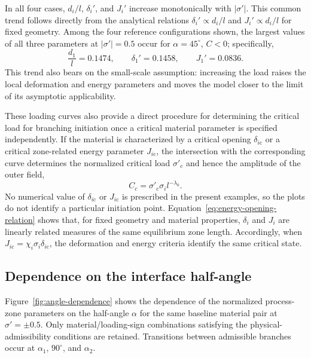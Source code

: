 \documentclass[pdflatex,onecolumn,sn-mathphys-ay]{sn-jnl}
\begin{document}
In all four cases, $d_i/l$, $\delta_i'$, and $J_i'$ increase
monotonically with $|\sigma'|$. This common trend follows directly from
the analytical relations
$\delta_i'\propto d_i/l$ and $J_i'\propto d_i/l$ for fixed geometry.
Among the four reference configurations shown, the largest values of all
three parameters at $|\sigma'|=0.5$ occur for
$\alpha=45^\circ$, $C<0$; specifically,
\begin{equation*}
  \frac{d_1}{l}=0.1474,\qquad
  \delta_1'=0.1458,\qquad
  J_1'=0.0836.
\end{equation*}
This trend also bears on the small-scale assumption: increasing the load
raises the local deformation and energy parameters and moves the model
closer to the limit of its asymptotic applicability.

These loading curves also provide a direct procedure for determining
the critical load for branching initiation once a critical material
parameter is specified independently. If the material is characterized by
a critical opening $\delta_{i\mathrm{c}}$ or a critical zone-related
energy parameter $J_{i\mathrm{c}}$, the intersection with the
corresponding curve determines the normalized critical load $\sigma'_c$
and hence the amplitude of the outer field,
\begin{equation*}
  C_c=\sigma'_c\sigma_i l^{-\lambda_0}.
\end{equation*}
No numerical value of $\delta_{i\mathrm{c}}$ or $J_{i\mathrm{c}}$ is
prescribed in the present examples, so the plots do not identify a
particular initiation point. Equation~\eqref{eq:energy-opening-relation}
shows that, for fixed geometry and material properties, $\delta_i$ and
$J_i$ are linearly related measures of the same equilibrium zone length.
Accordingly, when
$J_{i\mathrm{c}}=\chi_i\sigma_i\delta_{i\mathrm{c}}$, the
deformation and energy criteria identify the same critical state.

\subsection{Dependence on the interface half-angle}
\label{subsec:figure3}

Figure~\ref{fig:angle-dependence} shows the dependence of the normalized
process-zone parameters on the half-angle $\alpha$ for the same baseline
material pair at $\sigma'=\pm0.5$. Only material/loading-sign
combinations satisfying the physical-admissibility conditions are
retained. Transitions between admissible branches occur at
$\alpha_1$, $90^\circ$, and $\alpha_2$.
\end{document}
